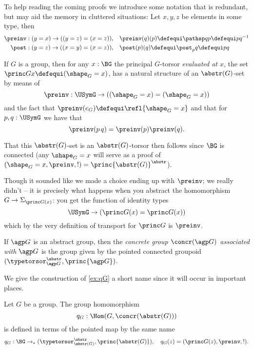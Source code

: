To help reading the coming proofs we introduce some notation that is redundant, but may aid the memory in cluttered situations:  Let $x,y,z$ be elements in some type, then
\begin{align*}
  \preinv:(y=x)\to ((y=z)=(x=z)),\quad&\preinv(q)(p)\defequi\pathsp qp\defequi pq^{-1}\\
  \post:(y=z)\to ((x=y)=(x=z)),\quad&\post(p)(q)\defequi\post_pq\defequi pq\\
\end{align*}


\begin{example}\label{ex:qG}
  If $G$ is a group, then for any $x:\BG$ the principal $G$-torsor \emph{evaluated at $x$}, \ie the set $\princ Gx\defequi(\shape_G=x)$, has a natural structure of an $\abstr(G)$-set by means of
  $$\preinv:\USymG\to ((\shape_G=x)=(\shape_G=x))$$ and the fact that $\preinv(e_G)\defequi\refl{\shape_G=x}$ and that for $p,q:\USymG$ we have that
  $$\preinv(p\,q)=\preinv(p)\preinv(q).$$


That this $\abstr(G)$-set is an $\abstr(G)$-torsor then follows since $\BG$ is connected (any $\shape_G=x$ will serve as a proof of $(\shape_G=x,\preinv,!)=\princ{\abstr(G)}^\abstr$).

Though it sounded like we made a choice ending up with $\preinv$; we really didn't -- it is precisely what happens when you abstract the homomorphism $G\to\Sigma_{\princ G(x)}$:
you get the function of identity types
$$\USymG\to (\princ G(x)=\princ G(x))$$
which by the very definition of transport for $\princ G$ is $\preinv$.
\end{example}

\begin{definition}
  If ${\agp G}$ is an abstract group, then the \emph{concrete group $\concr({\agp G})$ associated with ${\agp G}$} is the group given by the pointed connected groupoid $(\typetorsor_{\agp G}^\abstr,\princ {\agp G})$.
\end{definition}
We give the construction of \cref{ex:qG} a short name since it will occur in important places.
\begin{definition}
  Let $G$ be a group.
  The group homomorphism
  $$q_G:\Hom(G,\concr(\abstr(G)))$$
  is defined in terms of the pointed map by the same name
$$q_G:\BG\to_* (\typetorsor^\abstr_{\abstr(G)},\princ {\abstr(G)}),\quad q_G(z)=(\princ G(z),\preinv,!).$$
\end{definition}

